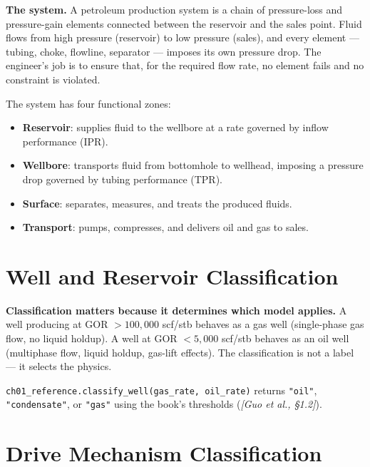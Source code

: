 \documentclass[11pt,a4paper,openany]{book}
\newcommand{\bookref}[1]{\textit{\color{blue!60!black}[Guo et al., #1]}}
\newcommand{\code}[1]{\texttt{#1}}
\begin{document}
\begin{theory}
\textbf{The system.} A petroleum production system is a chain of
pressure-loss and pressure-gain elements connected between the
reservoir and the sales point. Fluid flows from high pressure
(reservoir) to low pressure (sales), and every element — tubing,
choke, flowline, separator — imposes its own pressure drop. The
engineer's job is to ensure that, for the required flow rate, no
element fails and no constraint is violated.

The system has four functional zones:
\begin{itemize}
  \item \textbf{Reservoir}: supplies fluid to the wellbore at a rate
        governed by inflow performance (IPR).
  \item \textbf{Wellbore}: transports fluid from bottomhole to
        wellhead, imposing a pressure drop governed by tubing
        performance (TPR).
  \item \textbf{Surface}: separates, measures, and treats the
        produced fluids.
  \item \textbf{Transport}: pumps, compresses, and delivers oil and
        gas to sales.
\end{itemize}
\end{theory}

\section{Well and Reservoir Classification}

\begin{theory}
\textbf{Classification matters because it determines which model
applies.} A well producing at GOR $> 100{,}000$ scf/stb behaves as a
gas well (single-phase gas flow, no liquid holdup). A well at GOR
$< 5{,}000$ scf/stb behaves as an oil well (multiphase flow, liquid
holdup, gas-lift effects). The classification is not a label — it
selects the physics.
\end{theory}

\begin{implbox}
\code{ch01\_reference.classify\_well(gas\_rate, oil\_rate)} returns
\code{"oil"}, \code{"condensate"}, or \code{"gas"} using the book's
thresholds (\bookref{\S 1.2}).
\end{implbox}

\section{Drive Mechanism Classification}
\end{document}
